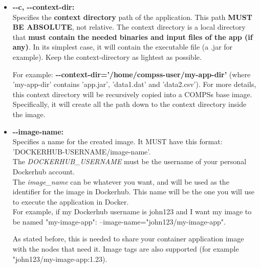 \begin{itemize}
 \item { 
 \textbf{-{}-c, -{}-context-dir:} \\ 
 Specifies the \textbf{context directory} path of the application. This path \textbf{MUST BE ABSOLUTE}, not relative.
 The context directory is a local directory that \textbf{must contain the needed binaries and input files of the app (if any)}.
 In its simplest case, it will contain the executable file (a .jar for example). Keep the context-directory as lightest as possible.
 
 For example: \textbf{-{}-context-dir='/home/compss-user/my-app-dir'} (where 'my-app-dir' contains 'app.jar', 'data1.dat' and 'data2.csv').
 For more details, this context directory will be recursively copied into a COMPSs base image. 
 Specifically, it will create all the path down to the context directory inside the image.
 }
 
 \item { 
 \textbf{-{}-image-name:} \\
 Specifies a name for the created image. It MUST have this format: 'DOCKERHUB-USERNAME/image-name'. \\
 The \textit{DOCKERHUB\_USERNAME} must be the username of your personal Dockerhub account. \\
 The \textit{image\_name} can be whatever you want, and will be used as the identifier for the image in Dockerhub.
 This name will be the one you will use to execute the application in Docker. \\
    For example, if my Dockerhub username is john123 and I want my image to be named "my-image-app": --image-name="john123/my-image-app".
 
 As stated before, this is needed to share your container application image with the nodes that need it.
 Image tags are also supported (for example "john123/my-image-app:1.23). 
 } 
\end{itemize}


 
